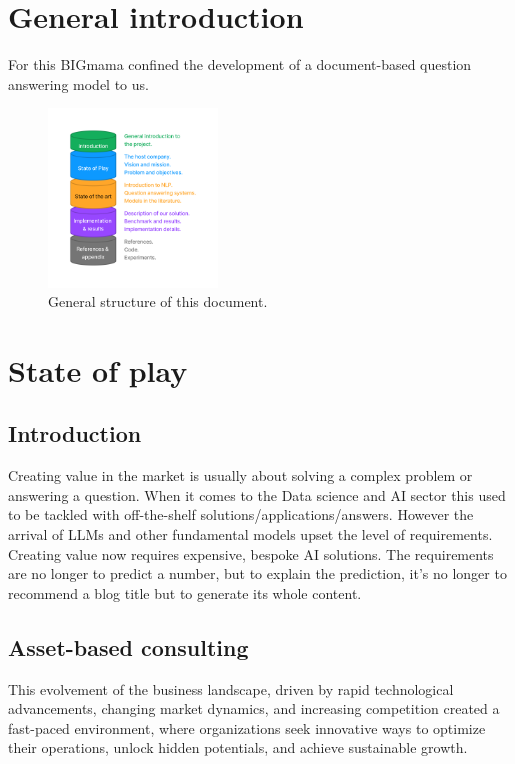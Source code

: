 \documentclass[a4paper,12pt]{article}
\begin{document}
\onecolumn
\tableofcontents
\listoffigures
\listoftables

\newpage
\printglossary[type=\acronymtype, title=List of acronyms]

\newpage

\section{General introduction}
For this BIGmama confined the development of a document-based question answering model to us.

\begin{figure}[h]
    \begin{center}
      \includegraphics[width=0.4\textwidth]{figures/plan.png}
    \end{center}
  \caption{General structure of this document.}
    \label{fig:plan}
\end{figure}

\section{State of play}
\subsection{Introduction}
Creating value in the market is usually about solving a complex problem or answering a question. When it comes to the Data science and AI sector this used to be tackled with off-the-shelf solutions/applications/answers.
However the arrival of LLMs and other fundamental models upset the level of requirements. Creating value now requires expensive,  bespoke AI solutions. 
The requirements are no longer to predict a number, but to explain the prediction, it's no longer to recommend a blog title but to generate its whole content.   

\subsection{Asset-based consulting}
This evolvement of the business landscape, driven by rapid technological advancements, changing market dynamics, and increasing competition created a fast-paced environment, where organizations seek innovative ways to optimize their operations, unlock hidden potentials, and achieve sustainable growth. 
\end{document}
